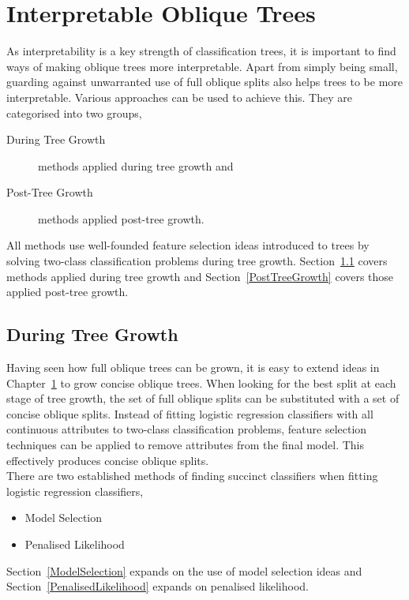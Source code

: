 \chapter{Interpretable Oblique Trees}
\label{InterpretableObliqueTrees}
As interpretability is a key strength of classification trees, it is important to find ways of making oblique trees more interpretable. Apart from simply being small, guarding against unwarranted use of full oblique splits also helps trees to be more interpretable. Various approaches can be used to achieve this. They are categorised into two groups, 
\begin{description}
\item[During Tree Growth] methods applied during tree growth and 
\item[Post-Tree Growth] methods applied post-tree growth.
\end{description}
All methods use well-founded feature selection ideas introduced to trees by solving two-class classification problems during tree growth. Section~\ref{DuringTreeGrowth} covers methods applied during tree growth and Section~\ref{PostTreeGrowth} covers those applied post-tree growth.  

\section{During Tree Growth}
\label{DuringTreeGrowth}
Having seen how full oblique trees can be grown, it is easy to extend ideas in Chapter~\ref{InterpretableObliqueTrees} to grow concise oblique trees. When looking for the best split at each stage of tree growth, the set of full oblique splits can be substituted with a set of concise oblique splits. Instead of fitting logistic regression classifiers with all continuous attributes to two-class classification problems, feature selection techniques can be applied to remove attributes from the final model. This effectively produces concise oblique splits.\\

There are two established methods of finding succinct classifiers when fitting logistic regression classifiers, 
\begin{itemize}
\item Model Selection
\item Penalised Likelihood
\end{itemize}
Section~\ref{ModelSelection} expands on the use of model selection ideas and Section~\ref{PenalisedLikelihood} expands on penalised likelihood.\\

